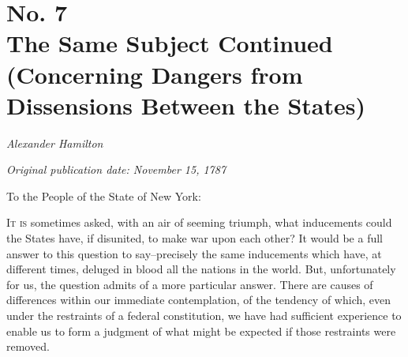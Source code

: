 \chapter[No. 7: The Same Subject Continued (Concerning Dangers from Dissensions Between the States)]{No. 7\\ {\small The Same Subject Continued (Concerning Dangers from Dissensions Between the States)}}

\textit{Alexander Hamilton}

\textit{Original publication date: November 15, 1787}
\vspace{1cm}

To the People of the State of New York:
\vspace{.4cm}

\textsc{It is} sometimes asked, with an air of seeming triumph, what inducements could the States have, if disunited, to make war upon each other? 
It would be a full answer to this question to say--precisely the same inducements which have, at different times, deluged in blood all the nations in the world. 
But, unfortunately for us, the question admits of a more particular answer. 
There are causes of differences within our immediate contemplation, of the tendency of which, even under the restraints of a federal constitution, we have had sufficient experience to enable us to form a judgment of what might be expected if those restraints were removed.

